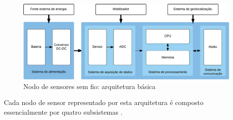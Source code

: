 \documentclass[
	12pt,				%
	openright,			%
	oneside,
	a4paper,			%
	english,			%
	french,				%
	spanish,			%
	brazil				%
	]{abntex2}
\begin{document}
\begin{figure}[htb]
	\caption{\label{fig_node_generic}Nodo de sensores sem fio: arquitetura básica}
	\begin{center}
		\includegraphics[width=\linewidth]{SensorNode_Generic}
	\end{center}
\end{figure}

Cada nodo de sensor representado por esta arquitetura é composto essencialmente por quatro subsistemas \cite{Akyildiz2002, Rawat2014}.
\end{document}
